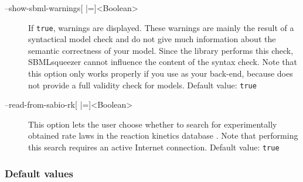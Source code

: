\begin{description}
\item[--show-sbml-warnings{[} |={]}<Boolean>]
  If \texttt{true}, \SBML warnings are displayed. These warnings are
  mainly the result of a syntactical model check and do not give much
  information about the semantic correctness of your model.
  Since the \SBML library performs this check, SBMLsqueezer cannot influence the
  content of the syntax check. Note that this option only works properly if you
  use \libSBML as your \SBML back-end, because \JSBML does not provide a full
  validity check for \SBML models.
  Default value: \texttt{true}

\item[--read-from-sabio-rk{[} |={]}<Boolean>]
  This option lets the user choose whether to search for experimentally
  obtained rate laws in the reaction kinetics database \SABIO. Note that
  performing this search requires an active Internet connection.
  Default value: \texttt{true}
\end{description}

\subsubsection{Default values}

